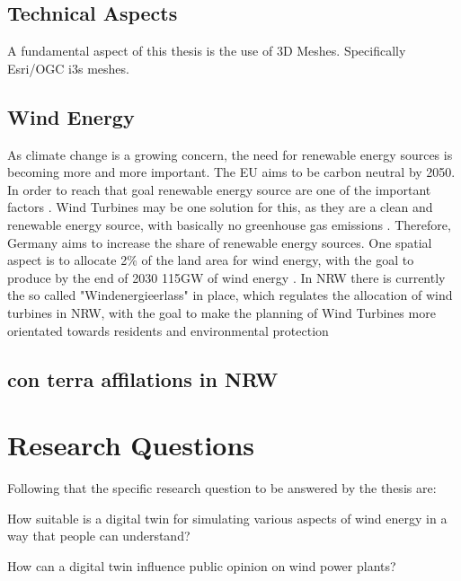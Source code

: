 \documentclass[11pt, titlepage, a4paper]{scrartcl}
\begin{document}
\begin{linenumbers}
    \subsection{Technical Aspects}
    A fundamental aspect of this thesis is the use of 3D Meshes. Specifically Esri/OGC i3s meshes. 
    \subsection{Wind Energy}
    As climate change is a growing concern, the need for renewable energy sources is becoming more and more important. The EU aims to be carbon neutral by 2050. In order to reach that goal renewable energy source are one of the important factors \cite{europeancommission.directorategeneralforclimateaction.GoingClimateneutral20502019}. Wind Turbines may be one solution for this, as they are a clean and renewable energy source, with basically no greenhouse gas emissions \cite{pryorClimateChangeImpacts2020}.
    Therefore, Germany aims to increase the share of renewable energy sources. One spatial aspect is to allocate 2\% of the land area for wind energy, with the goal to produce by the end of 2030 115GW of wind energy \cite{WindenergieLand}.
    In NRW there is currently the so called "Windenergieerlass" \cite{nrwErlassFurPlanung} in place, which regulates the allocation of wind turbines in NRW, with the goal to make the planning of Wind Turbines more orientated towards residents and environmental protection \cite{fachagenturwindenergieFachagenturWindenergieLand}
    \subsection{con terra affilations in NRW}
    \section{Research Questions}
    Following that the specific research question to be answered by the thesis are:
    \begin{questions}
        \item \label{rq:first_q} How suitable is a digital twin for simulating various aspects of wind energy in a way that people can understand?
        \item \label{rq:second_q} How can a digital twin influence public opinion on wind power plants?
    \end{questions}


\end{linenumbers}
\end{document}
